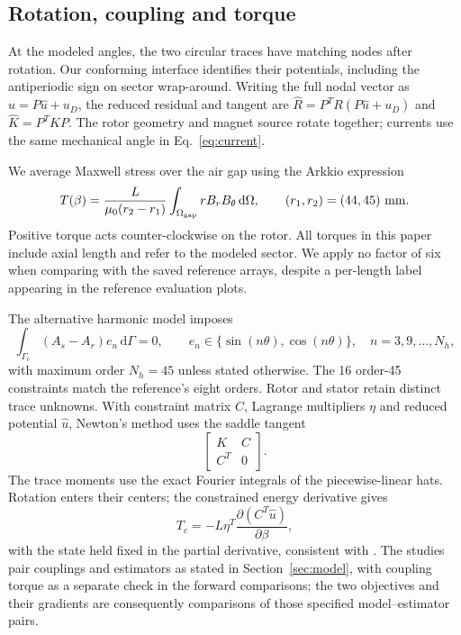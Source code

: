 \documentclass{anvil-paper}
\newcommand{\dd}{\,\mathrm{d}}
\begin{document}
\subsection{Rotation, coupling and torque}
At the modeled angles, the two circular traces have matching nodes after
rotation. Our conforming interface identifies their potentials, including
the antiperiodic sign on sector wrap-around. Writing the full nodal vector
as $u=P\hat u+u_D$, the reduced residual and tangent are
$\hat R=P^T R(P\hat u+u_D)$ and $\hat K=P^T K P$.
The rotor geometry and magnet source rotate together; currents use the
same mechanical angle in Eq.~\eqref{eq:current}.

We average Maxwell stress over the air gap using the Arkkio expression
\citep{arkkio1987}
\begin{equation}
 T(\beta)=\frac{L}{\mu_0(r_2-r_1)}
  \int_{\Omega_{\rm gap}}r B_r B_\theta\dd\Omega,
 \qquad(r_1,r_2)=(44,45)\ {\rm mm}.
 \label{eq:torque}
\end{equation}
Positive torque acts counter-clockwise on the rotor. All torques in this
paper include axial length and refer to the modeled sector. We apply no
factor of six when comparing with the saved reference arrays, despite a
per-length label appearing in the reference evaluation plots.

The alternative harmonic model imposes
\begin{equation}
 \int_{\Gamma_c}(A_s-A_r)e_n\dd\Gamma=0,\qquad
 e_n\in\{\sin(n\theta),\cos(n\theta)\},\quad n=3,9,\ldots,N_h,
\end{equation}
with maximum order $N_h=45$ unless stated otherwise. The 16 order-45
constraints match the reference's eight orders. Rotor and stator
retain distinct trace unknowns. With constraint matrix $C$, Lagrange
multipliers $\eta$ and reduced potential $\hat u$, Newton's method uses
the saddle tangent
\begin{equation}
 \begin{bmatrix}K&C\\ C^T&0\end{bmatrix}.
\end{equation}
The trace moments use the exact Fourier integrals of the piecewise-linear
hats. Rotation enters their centers; the constrained energy derivative gives
\begin{equation}
 T_c=-L\eta^T\frac{\partial(C^T\hat u)}{\partial\beta},
 \label{eq:couplingtorque}
\end{equation}
with the state held fixed in the partial derivative, consistent with
\citet{egger2022torque}. The studies pair couplings and estimators as
stated in Section~\ref{sec:model}, with coupling torque as a separate check
in the forward comparisons; the two objectives and their gradients are
consequently comparisons of those specified model--estimator pairs.
\end{document}
